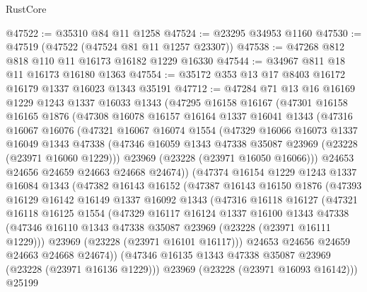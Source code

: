 \begin{lexlean}{RustCore}
\begin{coremodule}
@47522 := @35310 @84 @11 @1258
@47524 := @23295 @34953 @1160
@47530 := @47519 (@47522 (@47524 @81 @11 @1257 @23307))
@47538 := @47268 @812 @818 @110 @11 @16173 @16182 @1229 @16330
@47544 := @34967 @811 @18 @11 @16173 @16180 @1363
@47554 := @35172 @353 @13 @17 @8403 @16172 @16179 @1337 @16023 @1343 @35191
@47712 := @47284
    @71
    @13
    @16
    @16169
    @1229
    @1243
    @1337
    @16033
    @1343
    (@47295
      @16158
      @16167
      (@47301
        @16158
        @16165
        @1876
        (@47308
          @16078
          @16157
          @16164
          @1337
          @16041
          @1343
          (@47316
            @16067
            @16076
            (@47321
              @16067
              @16074
              @1554
              (@47329
                @16066
                @16073
                @1337
                @16049
                @1343
                @47338
                (@47346 @16059 @1343 @47338 @35087 @23969 (@23228 (@23971 @16060 @1229)))
                @23969
                (@23228 (@23971 @16050 @16066)))
              @24653
              @24656
              @24659
              @24663
              @24668
              @24674))
          (@47374
            @16154
            @1229
            @1243
            @1337
            @16084
            @1343
            (@47382
              @16143
              @16152
              (@47387
                @16143
                @16150
                @1876
                (@47393
                  @16129
                  @16142
                  @16149
                  @1337
                  @16092
                  @1343
                  (@47316
                    @16118
                    @16127
                    (@47321
                      @16118
                      @16125
                      @1554
                      (@47329
                        @16117
                        @16124
                        @1337
                        @16100
                        @1343
                        @47338
                        (@47346 @16110 @1343 @47338 @35087 @23969 (@23228 (@23971 @16111 @1229)))
                        @23969
                        (@23228 (@23971 @16101 @16117)))
                      @24653
                      @24656
                      @24659
                      @24663
                      @24668
                      @24674))
                  (@47346 @16135 @1343 @47338 @35087 @23969 (@23228 (@23971 @16136 @1229)))
                  @23969
                  (@23228 (@23971 @16093 @16142)))
                @25199

\end{coremodule}
\end{lexlean}
